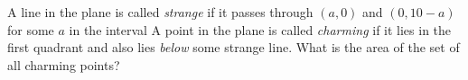 A line in the plane is called \textit{strange} if it passes through $(a,0)$ and $(0,10-a)$ for some $a$ in the interval   A point in the plane is called \textit{charming} if it lies in the first quadrant and also lies \textit{below} some strange line.  What is the area of the set of all charming points?